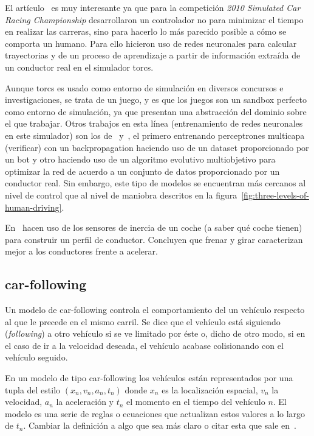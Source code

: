 El artículo~\cite{munoz2010human} es muy interesante ya que para la competición \textit{2010 Simulated Car Racing Championship} desarrollaron un controlador no para minimizar el tiempo en realizar las carreras, sino para hacerlo lo más parecido posible a cómo se comporta un humano. Para ello hicieron uso de redes neuronales para calcular trayectorias y de un proceso de aprendizaje a partir de información extraída de un conductor real en el simulador \gls{torcs}.

Aunque \gls{torcs} es usado como entorno de simulación en diversos concursos e investigaciones, se trata de un juego, y es que los juegos son un sandbox perfecto como entorno de simulación, ya que presentan una abstracción del dominio sobre el que trabajar. Otros trabajos en esta línea (entrenamiento de redes neuronales en este simulador) son los de~\cite{munoz2009controller} y~\cite{van2009robust}, el primero entrenando perceptrones multicapa (\TODO verificar) con un backpropagation haciendo uso de un dataset proporcionado por un bot y otro haciendo uso de un algoritmo evolutivo multiobjetivo para optimizar la red de acuerdo a un conjunto de datos proporcionado por un conductor real. Sin embargo, este tipo de modelos se encuentran más cercanos al nivel de control que al nivel de maniobra descritos en la figura~\ref{fig:three-levels-of-human-driving}.

En~\cite{van2013driver} hacen uso de los sensores de inercia de un coche (a saber qué coche tienen) para construir un perfil de conductor. Concluyen que frenar y girar caracterizan mejor a los conductores frente a acelerar.

\subsection{car-following}

Un modelo de \gls{car-following} controla el comportamiento del un vehículo respecto al que le precede en el mismo carril. Se dice que el vehículo está siguiendo (\textit{following}) a otro vehículo si se ve limitado por éste o, dicho de otro modo, si en el caso de ir a la velocidad deseada, el vehículo acabase colisionando con el vehículo seguido.

En un modelo de tipo car-following los vehículos están representados por una tupla del estilo $(x_n, v_n, a_n, t_n)$ donde $x_n$ es la localización espacial, $v_n$ la velocidad, $a_n$ la aceleración y $t_n$ el momento en el tiempo del vehículo $n$. El modelo es una serie de reglas o ecuaciones que actualizan estos valores a lo largo de $t_n$. Cambiar la definición a algo que sea más claro o citar esta que sale en~\cite{Aghabayk2015}.

